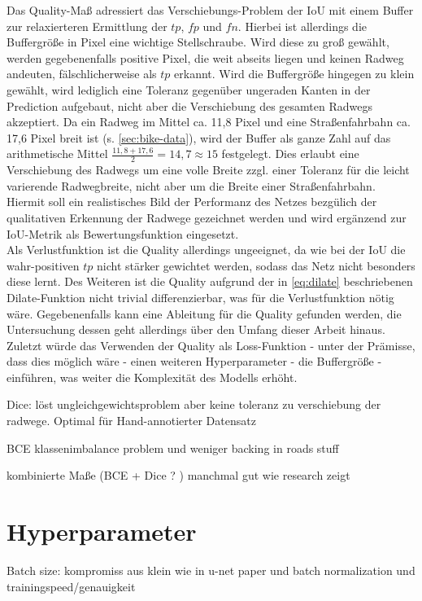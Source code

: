 Das Quality-Maß adressiert das Verschiebungs-Problem der \ac{IoU} mit einem Buffer zur relaxierteren Ermittlung der 
$tp$, $fp$ und $fn$. Hierbei ist allerdings die Buffergröße in Pixel eine wichtige Stellschraube. Wird diese zu groß 
gewählt, werden gegebenenfalls positive Pixel, die weit abseits liegen und keinen Radweg andeuten, fälschlicherweise 
als $tp$ erkannt. Wird die Buffergröße hingegen zu klein gewählt, wird lediglich eine Toleranz gegenüber ungeraden 
Kanten in der Prediction aufgebaut, nicht aber die Verschiebung des gesamten Radwegs akzeptiert. 
Da ein Radweg im Mittel ca. 11,8 Pixel und eine Straßenfahrbahn ca. 17,6 Pixel breit ist (s. \autoref{sec:bike-data}), 
wird der Buffer als ganze Zahl auf das arithmetische Mittel $\frac{11,8 + 17,6}{2} = 14,7 \approx 15$ festgelegt. 
Dies erlaubt eine Verschiebung des Radwegs um eine volle Breite zzgl. einer Toleranz für die leicht varierende Radwegbreite, 
nicht aber um die Breite einer Straßenfahrbahn. Hiermit soll ein realistisches Bild der Performanz des Netzes 
bezgülich der qualitativen Erkennung der Radwege gezeichnet werden und wird ergänzend zur \ac{IoU}-Metrik 
als Bewertungsfunktion eingesetzt. \\
Als Verlustfunktion ist die Quality allerdings ungeeignet, da wie bei der \ac{IoU} die wahr-positiven $tp$ nicht 
stärker gewichtet werden, sodass das Netz nicht besonders diese lernt. Des Weiteren ist die Quality aufgrund der 
in \autoref{eq:dilate} beschriebenen Dilate-Funktion nicht trivial differenzierbar, was für die Verlustfunktion nötig wäre. 
Gegebenenfalls kann eine Ableitung für die Quality gefunden werden, 
die Untersuchung dessen geht allerdings über den Umfang dieser Arbeit hinaus. 
Zuletzt würde das Verwenden der Quality als Loss-Funktion - unter der Prämisse, dass dies möglich wäre - einen weiteren 
Hyperparameter - die Buffergröße - einführen, was weiter die Komplexität des Modells erhöht.  

Dice: löst ungleichgewichtsproblem aber keine toleranz zu verschiebung der radwege. 
Optimal für Hand-annotierter Datensatz

BCE klassenimbalance problem und weniger backing in roads stuff

kombinierte Maße (BCE + Dice ? ) manchmal gut wie research zeigt

\section{Hyperparameter}
Batch size: kompromiss aus klein wie in u-net paper und batch normalization und trainingspeed/genauigkeit

